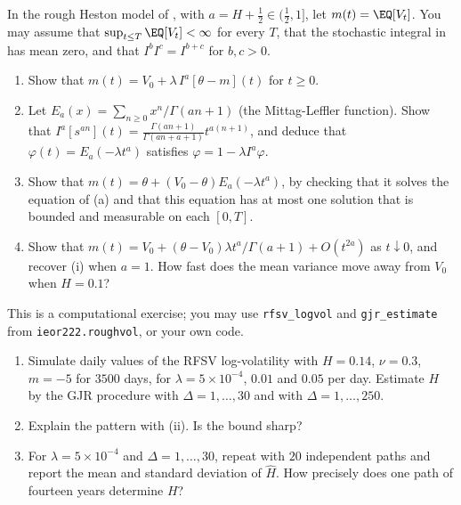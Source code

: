 \begin{exercise}\label{ex:rv-mittag-leffler}
\hard In the rough Heston model of , with $a=H+\frac12\in(\frac12,1]$, let
$m(t)=\EQ[V_t]$. You may assume that $\sup_{t\le T}\EQ[V_t]<\infty$ for every $T$, that the stochastic integral in
 has mean zero, and that $I^bI^c=I^{b+c}$ for $b,c>0$.
\begin{enumerate}[label=(\alph*)]
  \item Show that $m(t)=V_0+\lambda\,I^a[\theta-m](t)$ for $t\ge0$.
  \item Let $E_a(x)=\sum_{n\ge0}x^n/\Gamma(an+1)$ (the Mittag-Leffler function). Show that
    $I^a[s^{an}](t)=\frac{\Gamma(an+1)}{\Gamma(an+a+1)}t^{a(n+1)}$, and deduce that $\varphi(t)=E_a(-\lambda t^a)$ satisfies
    $\varphi=1-\lambda I^a\varphi$.
  \item Show that $m(t)=\theta+(V_0-\theta)E_a(-\lambda t^a)$, by checking that it solves the equation of (a) and that
    this equation has at most one solution that is bounded and measurable on each $[0,T]$.
  \item Show that $m(t)=V_0+(\theta-V_0)\lambda t^a/\Gamma(a+1)+O(t^{2a})$ as $t\downarrow0$, and recover
    (i) when $a=1$. How fast does the mean variance move away from $V_0$ when $H=0.1$?
\end{enumerate}
\end{exercise}

\begin{exercise}\label{ex:rv-gjr-sim}
\medium This is a computational exercise; you may use \texttt{rfsv\_logvol} and \texttt{gjr\_estimate} from
\texttt{ieor222.roughvol}, or your own code.
\begin{enumerate}[label=(\alph*)]
  \item Simulate daily values of the RFSV log-volatility  with $H=0.14$, $\nu=0.3$, $m=-5$ for
    $3500$ days, for $\lambda=5\times10^{-4}$, $0.01$ and $0.05$ per day. Estimate $H$ by the GJR procedure with
    $\Delta=1,\dots,30$ and with $\Delta=1,\dots,250$.
  \item Explain the pattern with (ii). Is the bound  sharp?
  \item For $\lambda=5\times10^{-4}$ and $\Delta=1,\dots,30$, repeat with $20$ independent paths and report the mean and
    standard deviation of $\hat H$. How precisely does one path of fourteen years determine $H$?
\end{enumerate}
\end{exercise}
